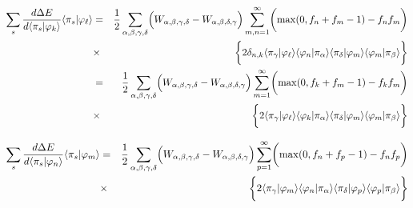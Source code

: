 \documentclass[11pt,a4paper]{report}
\begin{document}
\begin{eqnarray}
\sum_{s}\frac{d\Delta{E}}{d\langle\pi_s|\varphi_k\rangle}
\langle\pi_s|\varphi_\ell\rangle
&=&
\frac{1}{2}
\sum_{\alpha,\beta,\gamma,\delta} 
\Bigl(W_{\alpha,\beta,\gamma,\delta}-W_{\alpha,\beta,\delta,\gamma}\Bigr)
\sum_{m,n=1}^\infty\biggl(\max(0,f_n+f_m-1)-f_nf_m\biggr)
\nonumber\\
&\times&
\biggl\lbrace
2\delta_{n,k}
\langle\pi_\gamma|\varphi_\ell\rangle
\langle\varphi_n|\pi_\alpha\rangle
\langle\pi_\delta|\varphi_m\rangle\langle\varphi_m|\pi_\beta\rangle
\biggr\rbrace
\nonumber\\
&=&
\frac{1}{2}
\sum_{\alpha,\beta,\gamma,\delta} 
\Bigl(W_{\alpha,\beta,\gamma,\delta}-W_{\alpha,\beta,\delta,\gamma}\Bigr)
\sum_{m=1}^\infty\biggl(\max(0,f_k+f_m-1)-f_kf_m\biggr)
\nonumber\\
&\times&
\biggl\lbrace
2
\langle\pi_\gamma|\varphi_\ell\rangle
\langle\varphi_k|\pi_\alpha\rangle
\langle\pi_\delta|\varphi_m\rangle\langle\varphi_m|\pi_\beta\rangle
\biggr\rbrace
\nonumber\\
\end{eqnarray}


\begin{eqnarray}
\sum_{s}\frac{d\Delta{E}}{d\langle\pi_s|\varphi_n\rangle}
\langle\pi_s|\varphi_m\rangle
&=&
\frac{1}{2}
\sum_{\alpha,\beta,\gamma,\delta} 
\Bigl(W_{\alpha,\beta,\gamma,\delta}-W_{\alpha,\beta,\delta,\gamma}\Bigr)
\sum_{p=1}^\infty\biggl(\max(0,f_n+f_p-1)-f_nf_p\biggr)
\nonumber\\
&\times&
\biggl\lbrace
2
\langle\pi_\gamma|\varphi_m\rangle
\langle\varphi_n|\pi_\alpha\rangle
\langle\pi_\delta|\varphi_p\rangle\langle\varphi_p|\pi_\beta\rangle
\biggr\rbrace
\nonumber\\
\end{eqnarray}
\end{document}
